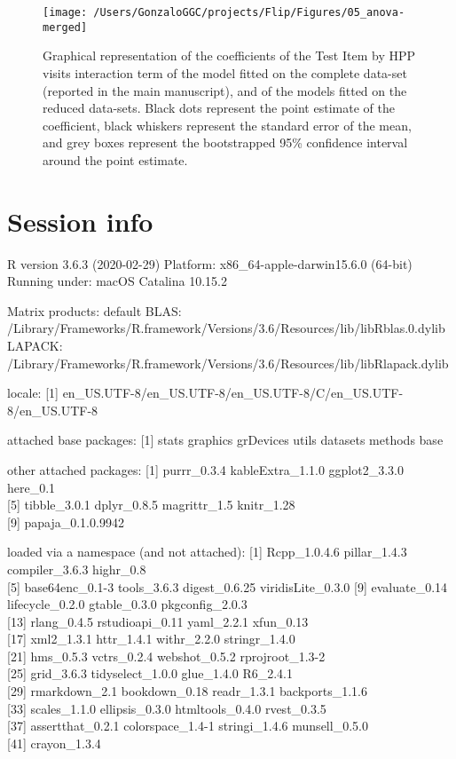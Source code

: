 \documentclass[english,man,man,floatsintext]{apa6}
\begin{document}
\begin{appendix}
\begin{figure}
\texttt{[image: /Users/GonzaloGGC/projects/Flip/Figures/05\_anova-merged]} \caption{Graphical representation of the coefficients of the Test Item by HPP visits interaction term of the model fitted on the complete data-set (reported in the main manuscript), and of the models fitted on the reduced data-sets. Black dots represent the point estimate of the coefficient, black whiskers represent the standard error of the mean, and grey boxes represent the bootstrapped 95\% confidence interval around the point estimate.}\label{fig:unnamed-chunk-16}
\end{figure}

\hypertarget{session-info}{%
\section{Session info}\label{session-info}}

R version 3.6.3 (2020-02-29) Platform: x86\_64-apple-darwin15.6.0
(64-bit) Running under: macOS Catalina 10.15.2

Matrix products: default BLAS:
/Library/Frameworks/R.framework/Versions/3.6/Resources/lib/libRblas.0.dylib
LAPACK:
/Library/Frameworks/R.framework/Versions/3.6/Resources/lib/libRlapack.dylib

locale: {[}1{]}
en\_US.UTF-8/en\_US.UTF-8/en\_US.UTF-8/C/en\_US.UTF-8/en\_US.UTF-8

attached base packages: {[}1{]} stats graphics grDevices utils datasets
methods base

other attached packages: {[}1{]} purrr\_0.3.4 kableExtra\_1.1.0
ggplot2\_3.3.0 here\_0.1\\
{[}5{]} tibble\_3.0.1 dplyr\_0.8.5 magrittr\_1.5 knitr\_1.28\\
{[}9{]} papaja\_0.1.0.9942

loaded via a namespace (and not attached): {[}1{]} Rcpp\_1.0.4.6
pillar\_1.4.3 compiler\_3.6.3 highr\_0.8\\
{[}5{]} base64enc\_0.1-3 tools\_3.6.3 digest\_0.6.25 viridisLite\_0.3.0
{[}9{]} evaluate\_0.14 lifecycle\_0.2.0 gtable\_0.3.0 pkgconfig\_2.0.3\\
{[}13{]} rlang\_0.4.5 rstudioapi\_0.11 yaml\_2.2.1 xfun\_0.13\\
{[}17{]} xml2\_1.3.1 httr\_1.4.1 withr\_2.2.0 stringr\_1.4.0\\
{[}21{]} hms\_0.5.3 vctrs\_0.2.4 webshot\_0.5.2 rprojroot\_1.3-2\\
{[}25{]} grid\_3.6.3 tidyselect\_1.0.0 glue\_1.4.0 R6\_2.4.1\\
{[}29{]} rmarkdown\_2.1 bookdown\_0.18 readr\_1.3.1 backports\_1.1.6\\
{[}33{]} scales\_1.1.0 ellipsis\_0.3.0 htmltools\_0.4.0 rvest\_0.3.5\\
{[}37{]} assertthat\_0.2.1 colorspace\_1.4-1 stringi\_1.4.6
munsell\_0.5.0\\
{[}41{]} crayon\_1.3.4


\end{appendix}
\end{document}
